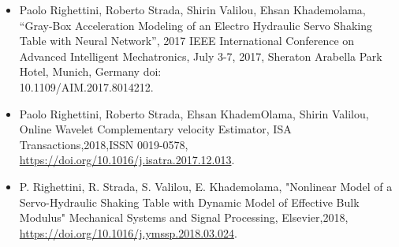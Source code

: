 \documentclass[fontsize=12pt]{tccv}
\begin{document}
\begin{itemize}
		\item Paolo Righettini, Roberto Strada, Shirin Valilou, Ehsan Khademolama, “Gray-Box Acceleration Modeling of an Electro Hydraulic Servo Shaking Table with Neural Network”, 2017 IEEE International Conference on Advanced Intelligent Mechatronics, July 3-7, 2017, Sheraton Arabella Park Hotel, Munich, Germany doi:\\10.1109/AIM.2017.8014212.
		
		\item Paolo Righettini, Roberto Strada, Ehsan KhademOlama, Shirin Valilou, Online Wavelet Complementary velocity Estimator, ISA Transactions,2018,ISSN 0019-0578, \url{https://doi.org/10.1016/j.isatra.2017.12.013}. 
		
		\item P. Righettini, R. Strada, S. Valilou, E. Khademolama, "Nonlinear Model of a Servo-Hydraulic Shaking Table with Dynamic Model of Effective Bulk Modulus" Mechanical Systems and Signal Processing, Elsevier,2018, \url{https://doi.org/10.1016/j.ymssp.2018.03.024}.
		
	\end{itemize}
\end{document}
